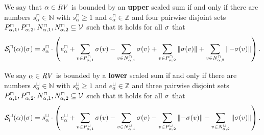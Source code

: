 \begin{definition}
  We say that $\alpha \in \mathit{RV}$ is bounded by an \textbf{upper} scaled sum if and only if there are numbers $s^\sqcap_\alpha \in \mathbb{N}$ with $s^\sqcap_\alpha \geq 1$ and $e^\sqcap_\alpha \in \mathbb{Z}$ and four pairwise disjoint sets $P_{\alpha,1}^\sqcap, P_{\alpha,2}^\sqcap, N_{\alpha,1}^\sqcap, N_{\alpha,2}^\sqcap \subseteq \mathcal{V}$ such that it holds for all $\sigma$ that
  \[ {\mathcal{S}^\sqcap_l}(\alpha)(\sigma) =
    s^\sqcap_\alpha \cdot \left(
        e^\sqcap_\alpha
      + \sum_{v \in P_{\alpha,1}^\sqcap} \sigma(v)
      - \sum_{v \in N_{\alpha,1}^\sqcap} \sigma(v)
      + \sum_{v \in P_{\alpha,2}^\sqcap} \left\Vert\sigma(v)\right\Vert
      + \sum_{v \in N_{\alpha,2}^\sqcap} \left\Vert-\sigma(v)\right\Vert
    \right). \]

  We say $\alpha \in \mathit{RV}$ is bounded by a \textbf{lower} scaled sum if and only if there are numbers $s^\sqcup_\alpha \in \mathbb{N}$ with $s^\sqcup_\alpha \geq 1$ and $e^\sqcup_\alpha \in \mathbb{Z}$ and three pairwise disjoint sets $P_{\alpha,1}^\sqcap, P_{\alpha,2}^\sqcap, N_{\alpha,1}^\sqcap, N_{\alpha,2}^\sqcap \subseteq \mathcal{V}$ such that it holds for all $\sigma$ that
  \[ {\mathcal{S}^\sqcup_l}(\alpha)(\sigma) =
    s^\sqcup_\alpha \cdot \left(
      e^\sqcup_\alpha
    + \sum_{v \in P_{\alpha,1}^\sqcup} \sigma(v)
    - \sum_{v \in N_{\alpha,1}^\sqcup} \sigma(v)
    - \sum_{v \in P_{\alpha,2}^\sqcup} \left\Vert-\sigma(v)\right\Vert
    - \sum_{v \in N_{\alpha,2}^\sqcup} \left\Vert\sigma(v)\right\Vert
  \right). \]
\end{definition}
